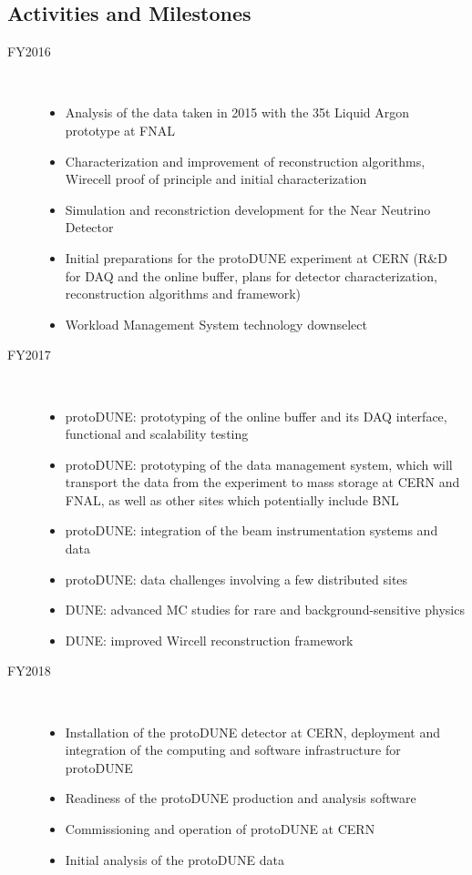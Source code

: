 \documentclass[pdftex,12pt,letter]{article}
\begin{document}
\subsection{Activities and Milestones}
\begin{description}
\item[FY2016] \
\begin{itemize}
\item Analysis of the data taken in 2015 with the 35t Liquid Argon prototype at FNAL
\item Characterization and improvement of reconstruction algorithms, Wirecell proof of principle and initial characterization
\item Simulation and reconstriction development for the Near Neutrino Detector
\item Initial preparations for the protoDUNE experiment at CERN (R\&D for DAQ and the online buffer, plans for detector characterization, reconstruction algorithms and framework)
\item Workload Management System technology downselect
\end{itemize}
\item[FY2017] \
\begin{itemize}
\item protoDUNE: prototyping of the online buffer and its DAQ interface, functional and scalability testing
\item protoDUNE: prototyping of the data management system, which will transport the data from the experiment to mass storage at CERN and FNAL, as well as other sites which potentially include BNL
\item protoDUNE: integration of the beam instrumentation systems and data
\item protoDUNE: data challenges involving a few distributed sites
\item DUNE: advanced MC studies for rare and background-sensitive physics
\item DUNE: improved Wircell reconstruction framework
\end{itemize}

\item[FY2018] \
\begin{itemize}
\item Installation of the protoDUNE detector at CERN, deployment and integration of the computing and software infrastructure for protoDUNE
\item Readiness of the protoDUNE production and analysis software
\item Commissioning and operation of protoDUNE at CERN
\item Initial analysis of the protoDUNE data
\end{itemize}


\end{description}
\end{document}
